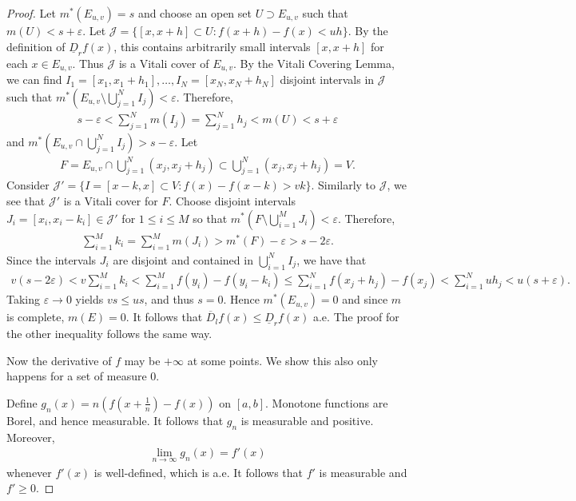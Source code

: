 \documentclass[11pt]{amsart}
\theoremstyle{definition}
\numberwithin{equation}{section}
\begin{document}
\begin{proof}
    Let $m^*(E_{u,v})=s$ and choose an open set $U\supset E_{u,v}$ such that $m(U)<s+\varepsilon$. Let $\mathcal J=\{[x,x+h]\subset U:f(x+h)-f(x)<uh\}$. By the definition of $\underline D_rf(x)$, this contains arbitrarily small intervals $[x,x+h]$ for each $x\in E_{u,v}$. Thus $\mathcal J$ is a Vitali cover of $E_{u,v}$. By the Vitali Covering Lemma, we can find $I_1=[x_1,x_1+h_1],\ldots,I_N=[x_N,x_N+h_N]$ disjoint intervals in $\mathcal J$ such that $m^*(E_{u,v}\setminus \bigcup_{j=1}^NI_j)<\varepsilon$. Therefore,
    \begin{align*}
        s-\varepsilon<\sum_{j=1}^Nm(I_j)=\sum_{j=1}^Nh_j<m(U)<s+\varepsilon
    \end{align*}
    and $m^*(E_{u,v}\cap \bigcup_{j=1}^NI_j)>s-\varepsilon$. Let
    \begin{align*}
        F=E_{u,v}\cap \bigcup_{j=1}^N(x_j,x_j+h_j)\subset \bigcup_{j=1}^N(x_j,x_j+h_j)=V.
    \end{align*}
    Consider $\mathcal J'=\{I=[x-k,x]\subset V:f(x)-f(x-k)>vk\}$. Similarly to $\mathcal J$, we see that $\mathcal J'$ is a Vitali cover for $F$. Choose disjoint intervals $J_i=[x_i,x_i-k_i]\in\mathcal J'$ for $1\le i\le M$ so that $m^*(F\setminus \bigcup_{i=1}^MJ_i)<\varepsilon$. Therefore,
    \begin{align*}
        \sum_{i=1}^Mk_i=\sum_{i=1}^Mm(J_i)>m^*(F)-\varepsilon>s-2\varepsilon.
    \end{align*}
    Since the intervals $J_i$ are disjoint and contained in $\bigcup_{i=1}^NI_j$, we have that 
    \begin{align*}
        v(s-2\varepsilon)<v\sum_{i=1}^Mk_i<\sum_{i=1}^Mf(y_i)-f(y_i-k_i)\le\sum_{i=1}^Nf(x_j+h_j)-f(x_j)<\sum_{i=1}^Nuh_j<u(s+\varepsilon).
    \end{align*}
    Taking $\varepsilon\to 0$ yields $vs\le us$, and thus $s=0$. Hence $m^*(E_{u,v})=0$ and since $m$ is complete, $m(E)=0$. It follows that $\overline D_lf(x)\le \underline D_rf(x)$ a.e. The proof for the other inequality follows the same way.

    Now the derivative of $f$ may be $+\infty$ at some points. We show this also only happens for a set of measure 0.

    Define $g_n(x)=n(f(x+\frac{1}{n})-f(x))$ on $[a,b]$. Monotone functions are Borel, and hence measurable. It follows that $g_n$ is measurable and positive. Moreover,
    \begin{align*}
        \lim_{n\to\infty}g_n(x)=f'(x)
    \end{align*}
    whenever $f'(x)$ is well-defined, which is a.e. It follows that $f'$ is measurable and $f'\ge 0$.


\end{proof}
\end{document}
